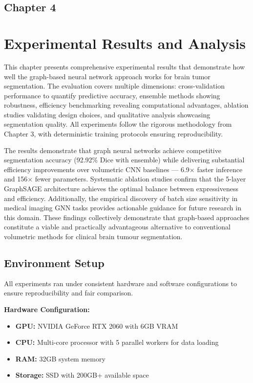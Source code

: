 \begin{center}
    \section*{\fontsize{20}{20}\selectfont Chapter 4}
\end{center}
\vspace{10mm}

\section{Experimental Results and Analysis}

This chapter presents comprehensive experimental results that demonstrate how well the graph-based neural network approach works for brain tumor segmentation. The evaluation covers multiple dimensions: cross-validation performance to quantify predictive accuracy, ensemble methods showing robustness, efficiency benchmarking revealing computational advantages, ablation studies validating design choices, and qualitative analysis showcasing segmentation quality. All experiments follow the rigorous methodology from Chapter 3, with deterministic training protocols ensuring reproducibility.

The results demonstrate that graph neural networks achieve competitive segmentation accuracy (92.92\% Dice with ensemble) while delivering substantial efficiency improvements over volumetric CNN baselines — 6.9$\times$ faster inference and 156$\times$ fewer parameters. Systematic ablation studies confirm that the 5-layer GraphSAGE architecture achieves the optimal balance between expressiveness and efficiency. Additionally, the empirical discovery of batch size sensitivity in medical imaging GNN tasks provides actionable guidance for future research in this domain. These findings collectively demonstrate that graph-based approaches constitute a viable and practically advantageous alternative to conventional volumetric methods for clinical brain tumour segmentation.


\subsection{Environment Setup}

All experiments ran under consistent hardware and software configurations to ensure reproducibility and fair comparison.

\textbf{Hardware Configuration:}
\begin{itemize}
    \item \textbf{GPU:} NVIDIA GeForce RTX 2060 with 6GB VRAM
    \item \textbf{CPU:} Multi-core processor with 5 parallel workers for data loading
    \item \textbf{RAM:} 32GB system memory
    \item \textbf{Storage:} SSD with 200GB+ available space
\end{itemize}

